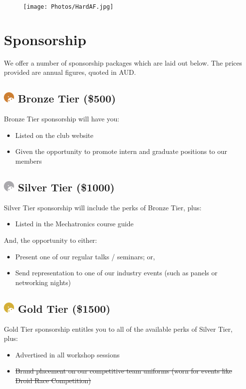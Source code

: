 \documentclass[a4paper,12pt]{report}
\begin{document}
\begin{figure}[H]
    \centering
    \texttt{[image: Photos/HardAF.jpg]}
\end{figure}

\newpage

\section*{Sponsorship}
\large
We offer a number of sponsorship packages which are laid out below. The prices provided are annual figures, quoted in AUD.
\normalsize

\subsection*{
    \includegraphics[width=1em]{Sponsor Icons/Bronze}
    \textcolor{sponsor_bronze}{Bronze Tier (\$500)}
}
Bronze Tier sponsorship will have you:
\begin{itemize}
    \item Listed on the club website
    \item Given the opportunity to promote intern and graduate positions to our members
\end{itemize}

\subsection*{
    \includegraphics[width=1em]{Sponsor Icons/Silver}
    \textcolor{sponsor_silver}{Silver Tier (\$1000)}
}
Silver Tier sponsorship will include the perks of Bronze Tier, plus:
\begin{itemize}
    \item Listed in the Mechatronics course guide
\end{itemize}
And, the opportunity to either:
\begin{itemize}
    \item Present one of our regular talks / seminars; or,
    \item Send representation to one of our industry events (such as panels or networking nights)
\end{itemize}

\subsection*{
    \includegraphics[width=1em]{Sponsor Icons/Gold}
    \textcolor{sponsor_gold}{Gold Tier (\$1500)}
}
Gold Tier sponsorship entitles you to all of the available perks of Silver Tier, plus:
\begin{itemize}
    \item Advertised in all workshop sessions
    \item \st{Brand placement on our competitive team uniforms (worn for events like Droid Race Competition)}
\end{itemize}
\end{document}
